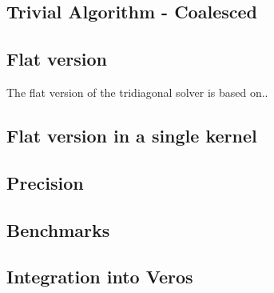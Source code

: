\documentclass[a4paper,oneside]{memoir}
\begin{document}
\subsection{Trivial Algorithm - Coalesced}
\subsection{Flat version}
The flat version of the tridiagonal solver is based on.. \cite{andreetta2016finpar}
\subsection{Flat version in a single kernel}
\subsection{Precision}
\subsection{Benchmarks}
\subsection{Integration into Veros}



\end{document}
